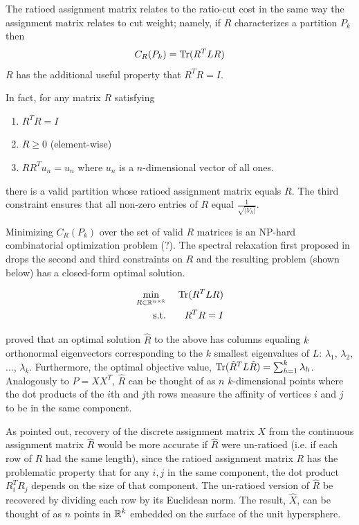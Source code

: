 The ratioed assignment matrix relates to the ratio-cut cost in the same
way the assignment matrix relates to cut weight; namely, if $R$
characterizes a partition $P_k$ then
\[ C_R(P_k) = \operatorname{Tr}(R^T L R) \]
$R$ has the additional useful property that $R^T R = I$.

In fact, for any matrix $R$ satisfying
\begin{enumerate}
\item
$R^T R = I$

\item
$R \geq 0$ (element-wise)

\item
$R R^T u_n = u_n$ where $u_n$ is a $n$-dimensional vector of all ones.
\end{enumerate}
there is a valid partition whose ratioed assignment matrix equals $R$.
The third constraint ensures that all non-zero entries of $R$ equal
$\frac{1}{\sqrt{|V_h|}}$.

Minimizing $C_R(P_k)$ over the set of valid $R$ matrices is an NP-hard
combinatorial optimization problem (?). The spectral relaxation first
proposed in \cite{Chan:94} drops the second and third constraints on
$R$ and the resulting problem (shown below) has a closed-form optimal
solution.

\begin{equation} \label{spectral_k-partition}
\begin{aligned}
\min_{R \in \mathbb{R}^{n \times k}} &\;& \operatorname{Tr}(R^T L R) \\
\text{s.t.}                  &\;& R^T R = I    \\
\end{aligned}
\end{equation}

\cite{Fan:50} proved that an optimal solution $\hat{R}$ to the above
has columns equaling $k$ orthonormal eigenvectors corresponding to
the $k$ smallest eigenvalues of $L$:
$\lambda_1$, $\lambda_2$, ..., $\lambda_k$.
Furthermore, the optimal objective value,
$\operatorname{Tr}(\hat{R}^T L \hat{R}) = \sum_{h=1}^k \lambda_h$.
Analogously to $P = X X^T$, $\hat{R}$ can be thought of as $n$
$k$-dimensional points where the dot products of the $i$th and $j$th
rows measure the affinity of vertices $i$ and $j$ to be in the same
component.

As \cite{Chan:94} pointed out, recovery of the discrete assignment matrix
$X$ from the continuous assignment matrix $\hat{R}$ would be more
accurate if $\hat{R}$ were un-ratioed (i.e. if each row of $R$ had the
same length), since the ratioed assignment matrix $R$ has the
problematic property that for any $i,j$ in the same component, the dot
product $R_i^T R_j$ depends on the size of that component.
The un-ratioed version of $\hat{R}$ be recovered by dividing each row
by its Euclidean norm. The result, $\hat{X}$, can be thought of as $n$
points in $\mathbb{R}^k$ embedded on the surface of the unit hypersphere.

